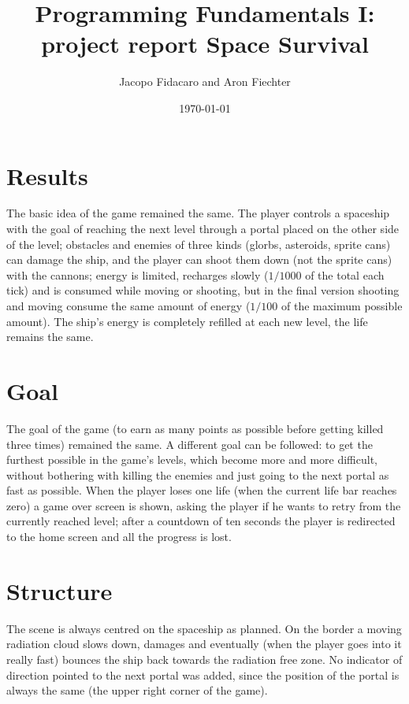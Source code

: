 \documentclass[12pt]{article}
\title{Programming Fundamentals I: project report Space Survival}
\author{Jacopo Fidacaro and Aron Fiechter}
\date{\today}
\begin{document}
\maketitle

\section*{Results}
The basic idea of the game remained the same. The player controls a spaceship with the goal of reaching the next level through a portal placed on the other side of the level; obstacles and enemies of three kinds (glorbs, asteroids, sprite cans) can damage the ship, and the player can shoot them down (not the sprite cans) with the cannons; energy is limited, recharges slowly ($1/1000$ of the total each tick) and is consumed while moving or shooting, but in the final version shooting and moving consume the same amount of energy ($1/100$ of the maximum possible amount).
The ship's energy is completely refilled at each new level, the life remains the same.

\section*{Goal}
The goal of the game (to earn as many points as possible before getting killed three times) remained the same. A different goal can be followed: to get the furthest possible in the game's levels, which become more and more difficult, without bothering with killing the enemies and just going to the next portal as fast as possible.
When the player loses one life (when the current life bar reaches zero) a game over screen is shown, asking the player if he wants to retry from the currently reached level; after a countdown of ten seconds the player is redirected to the home screen and all the progress is lost.

\section*{Structure}
The scene is always centred on the spaceship as planned. On the border a moving radiation cloud slows down, damages and eventually (when the player goes into it really fast) bounces the ship back towards the radiation free zone. No indicator of direction pointed to the next portal was added, since the position of the portal is always the same (the upper right corner of the game).
\end{document}
